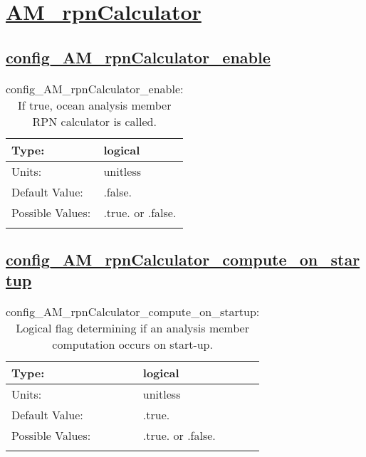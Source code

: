 \section[AM\_rpnCalculator]{\hyperref[sec:nm_tab_AM_rpnCalculator]{AM\_rpnCalculator}}
\label{sec:nm_sec_AM_rpnCalculator}
\subsection[config\_AM\_rpnCalculator\_enable]{\hyperref[sec:nm_tab_AM_rpnCalculator]{config\_AM\_rpnCalculator\_enable}}
\label{subsec:nm_sec_config_AM_rpnCalculator_enable}
\begin{center}
\begin{longtable}{| p{2.0in} || p{4.0in} |}
    \hline
    Type: & logical \\
    \hline
    Units: & \si{unitless} \\
    \hline
    Default Value: & .false. \\
    \hline
    Possible Values: & .true. or .false. \\
    \hline
    \caption{config\_AM\_rpnCalculator\_enable: If true, ocean analysis member RPN calculator is called.}
\end{longtable}
\end{center}
\subsection[config\_AM\_rpnCalculator\_compute\_on\_startup]{\hyperref[sec:nm_tab_AM_rpnCalculator]{config\_AM\_rpnCalculator\_compute\_on\_startup}}
\label{subsec:nm_sec_config_AM_rpnCalculator_compute_on_startup}
\begin{center}
\begin{longtable}{| p{2.0in} || p{4.0in} |}
    \hline
    Type: & logical \\
    \hline
    Units: & \si{unitless} \\
    \hline
    Default Value: & .true. \\
    \hline
    Possible Values: & .true. or .false. \\
    \hline
    \caption{config\_AM\_rpnCalculator\_compute\_on\_startup: Logical flag determining if an analysis member computation occurs on start-up.}
\end{longtable}
\end{center}
